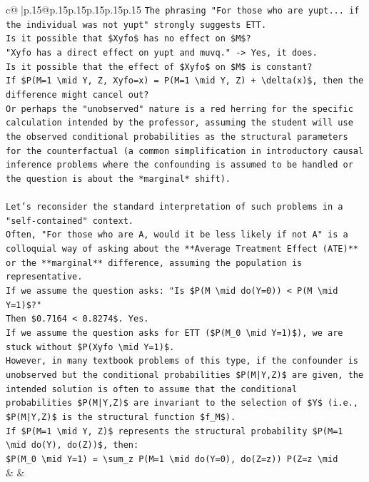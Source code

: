 \documentclass{article}
\begin{document}
{\begin{supertabular}{c@{$\;$}|p{.15\linewidth}@{}p{.15\linewidth}p{.15\linewidth}p{.15\linewidth}p{.15\linewidth}p{.15\linewidth}}
{{{\texttt{The phrasing "For those who are yupt... if the individual was not yupt" strongly suggests ETT.} \\
\texttt{Is it possible that \$Xyfo\$ has no effect on \$M\$?} \\
\texttt{"Xyfo has a direct effect on yupt and muvq." {-}> Yes, it does.} \\
\texttt{Is it possible that the effect of \$Xyfo\$ on \$M\$ is constant?} \\
\texttt{If \$P(M=1 \textbackslash{}mid Y, Z, Xyfo=x) = P(M=1 \textbackslash{}mid Y, Z) + \textbackslash{}delta(x)\$, then the difference might cancel out?} \\
\texttt{Or perhaps the "unobserved" nature is a red herring for the specific calculation intended by the professor, assuming the student will use the observed conditional probabilities as the structural parameters for the counterfactual (a common simplification in introductory causal inference problems where the confounding is assumed to be handled or the question is about the *marginal* shift).} \\
\\ 
\texttt{Let's reconsider the standard interpretation of such problems in a "self{-}contained" context.} \\
\texttt{Often, "For those who are A, would it be less likely if not A" is a colloquial way of asking about the **Average Treatment Effect (ATE)** or the **marginal** difference, assuming the population is representative.} \\
\texttt{If we assume the question asks: "Is \$P(M \textbackslash{}mid do(Y=0)) < P(M \textbackslash{}mid Y=1)\$?"} \\
\texttt{Then \$0.7164 < 0.8274\$. Yes.} \\
\texttt{If we assume the question asks for ETT (\$P(M\_0 \textbackslash{}mid Y=1)\$), we are stuck without \$P(Xyfo \textbackslash{}mid Y=1)\$.} \\
\texttt{However, in many textbook problems of this type, if the confounder is unobserved but the conditional probabilities \$P(M|Y,Z)\$ are given, the intended solution is often to assume that the conditional probabilities \$P(M|Y,Z)\$ are invariant to the selection of \$Y\$ (i.e., \$P(M|Y,Z)\$ is the structural function \$f\_M\$).} \\
\texttt{If \$P(M=1 \textbackslash{}mid Y, Z)\$ represents the structural probability \$P(M=1 \textbackslash{}mid do(Y), do(Z))\$, then:} \\
\texttt{\$P(M\_0 \textbackslash{}mid Y=1) = \textbackslash{}sum\_z P(M=1 \textbackslash{}mid do(Y=0), do(Z=z)) P(Z=z \textbackslash{}mid} \\
            }
        }
    }
    & & \\ \\


\end{supertabular}}
\end{document}
